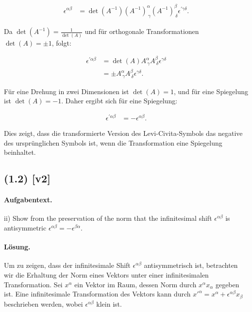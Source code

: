 \documentclass[11pt,a4paper]{article}
\begin{document}
\begin{align*}
\epsilon^{\alpha \beta} &= \det(A^{-1}) (A^{-1})^\alpha_{\ \gamma} (A^{-1})^\beta_{\ \delta} \epsilon^{\prime \gamma \delta}.
\end{align*}

Da $\det(A^{-1}) = \frac{1}{\det(A)}$ und für orthogonale Transformationen $\det(A) = \pm 1$, folgt:

\begin{align*}
\epsilon^{\prime \alpha \beta} &= \det(A) A^\alpha_{\ \gamma} A^\beta_{\ \delta} \epsilon^{\gamma \delta} \\
&= \pm A^\alpha_{\ \gamma} A^\beta_{\ \delta} \epsilon^{\gamma \delta}.
\end{align*}

Für eine Drehung in zwei Dimensionen ist $\det(A) = 1$, und für eine Spiegelung ist $\det(A) = -1$. Daher ergibt sich für eine Spiegelung:

\begin{align*}
\epsilon^{\prime \alpha \beta} &= -\epsilon^{\alpha \beta}.
\end{align*}

Dies zeigt, dass die transformierte Version des Levi-Civita-Symbols das negative des ursprünglichen Symbols ist, wenn die Transformation eine Spiegelung beinhaltet.


\subsection*{(1.2) [v2]}
\paragraph{Aufgabentext.}
ii) Show from the preservation of the norm that the infinitesimal shift $\epsilon^{\alpha \beta}$ is antisymmetric $\epsilon^{\alpha \beta}=-\epsilon^{\beta \alpha}$.

\paragraph{Lösung.}
Um zu zeigen, dass der infinitesimale Shift $\epsilon^{\alpha \beta}$ antisymmetrisch ist, betrachten wir die Erhaltung der Norm eines Vektors unter einer infinitesimalen Transformation. Sei $x^\alpha$ ein Vektor im Raum, dessen Norm durch $x^\alpha x_\alpha$ gegeben ist. Eine infinitesimale Transformation des Vektors kann durch $x'^\alpha = x^\alpha + \epsilon^{\alpha \beta} x_\beta$ beschrieben werden, wobei $\epsilon^{\alpha \beta}$ klein ist.
\end{document}
